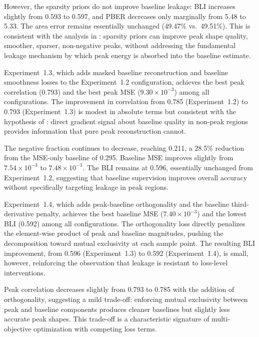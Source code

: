 However, the sparsity priors do not improve baseline leakage: BLI increases slightly from 0.593 to 0.597, and PBER decreases only marginally from 5.48 to 5.33. The area error remains essentially unchanged (49.47\% vs.\ 49.51\%). This is consistent with the analysis in : sparsity priors can improve peak shape quality, smoother, sparser, non-negative peaks, without addressing the fundamental leakage mechanism by which peak energy is absorbed into the baseline estimate.


Experiment~1.3, which adds masked baseline reconstruction and baseline smoothness losses to the Experiment~1.2 configuration, achieves the best peak correlation (0.793) and the best peak MSE ($9.30 \times 10^{-3}$) among all configurations. The improvement in correlation from 0.785 (Experiment~1.2) to 0.793 (Experiment~1.3) is modest in absolute terms but consistent with the hypothesis of : direct gradient signal about baseline quality in non-peak regions provides information that pure peak reconstruction cannot.

The negative fraction continues to decrease, reaching 0.211, a 28.5\% reduction from the MSE-only baseline of 0.295. Baseline MSE improves slightly from $7.54 \times 10^{-3}$ to $7.48 \times 10^{-3}$. The BLI remains at 0.596, essentially unchanged from Experiment~1.2, suggesting that baseline supervision improves overall accuracy without specifically targeting leakage in peak regions.


Experiment~1.4, which adds peak-baseline orthogonality and the baseline third-derivative penalty, achieves the best baseline MSE ($7.40 \times 10^{-3}$) and the lowest BLI (0.592) among all configurations. The orthogonality loss directly penalizes the element-wise product of peak and baseline magnitudes, pushing the decomposition toward mutual exclusivity at each sample point. The resulting BLI improvement, from 0.596 (Experiment~1.3) to 0.592 (Experiment~1.4), is small, however, reinforcing the observation that leakage is resistant to loss-level interventions.

Peak correlation decreases slightly from 0.793 to 0.785 with the addition of orthogonality, suggesting a mild trade-off: enforcing mutual exclusivity between peak and baseline components produces cleaner baselines but slightly less accurate peak shapes. This trade-off is a characteristic signature of multi-objective optimization with competing loss terms.


